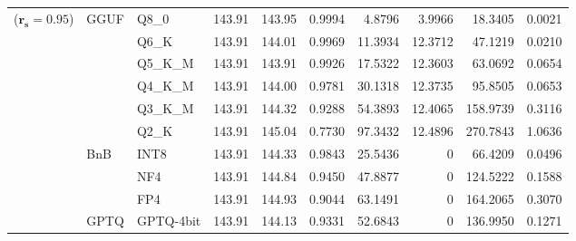\begin{table}[t]
{\begin{tabular}{ll l rrrrrrr}
{\small ($\mathbf{r_s{=}0.95}$)} & GGUF & Q8\_0 & 143.91 & 143.95 & 0.9994 & 4.8796 & 3.9966 & 18.3405 & 0.0021 \\
 &  & Q6\_K & 143.91 & 144.01 & 0.9969 & 11.3934 & 12.3712 & 47.1219 & 0.0210 \\
 &  & Q5\_K\_M & 143.91 & 143.91 & 0.9926 & 17.5322 & 12.3603 & 63.0692 & 0.0654 \\
 &  & Q4\_K\_M & 143.91 & 144.00 & 0.9781 & 30.1318 & 12.3735 & 95.8505 & 0.0653 \\
 &  & Q3\_K\_M & 143.91 & 144.32 & \cellcolor{red!18} 0.9288 & \cellcolor{red!18} 54.3893 & 12.4065 & \cellcolor{red!18} 158.9739 & \cellcolor{red!18} 0.3116 \\
 &  & Q2\_K & 143.91 & 145.04 & \cellcolor{red!35} 0.7730 & \cellcolor{red!35} 97.3432 & 12.4896 & \cellcolor{red!35} 270.7843 & \cellcolor{red!35} 1.0636 \\
 & BnB & INT8 & 143.91 & 144.33 & 0.9843 & 25.5436 & \cellcolor{cyan!12} $0$ & 66.4209 & 0.0496 \\
 &  & NF4 & 143.91 & 144.84 & \cellcolor{red!18} 0.9450 & \cellcolor{red!18} 47.8877 & \cellcolor{cyan!12} $0$ & \cellcolor{red!18} 124.5222 & \cellcolor{red!18} 0.1588 \\
 &  & FP4 & 143.91 & 144.93 & \cellcolor{red!18} 0.9044 & \cellcolor{red!18} 63.1491 & \cellcolor{cyan!12} $0$ & \cellcolor{red!18} 164.2065 & \cellcolor{red!18} 0.3070 \\
 & GPTQ & GPTQ-4bit & 143.91 & 144.13 & \cellcolor{red!18} 0.9331 & \cellcolor{red!18} 52.6843 & \cellcolor{cyan!12} $0$ & \cellcolor{red!18} 136.9950 & \cellcolor{red!18} 0.1271 \\
\bottomrule
\end{tabular}}
\end{table}